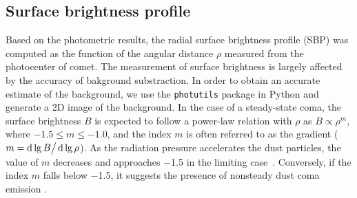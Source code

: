 

\subsection{Surface brightness profile}

Based on the photometric results, the radial surface brightness profile (SBP) was computed as the function of the angular distance $\rho$ measured from the photocenter of comet. The measurement of surface brightness is largely affected by the accuracy of bakground substraction. In order to obtain an accurate estimate of the background, we use the \texttt{photutils} package in Python and generate a 2D image of the background. 
In the case of a steady-state coma, the surface brightness $B$ is expected to follow a power-law relation with $\rho$ as $B \propto \rho^m$, where $-1.5 \leqslant m \leqslant -1.0$, and the index $m$ is often referred to as the gradient ($m=\mathop{}\!\mathrm{d}\lg{B} \big/ \mathop{}\!\mathrm{d}\lg{\rho}$). As the radiation pressure accelerates the dust particles, the value of $m$ decreases and approaches \num{-1.5} in the limiting case~\citep{jewitt_surface_1987}. Conversely, if the index $m$ falls below \num{-1.5}, it suggests the presence of nonsteady dust coma emission \citep{lowry_ccd_1999}.


